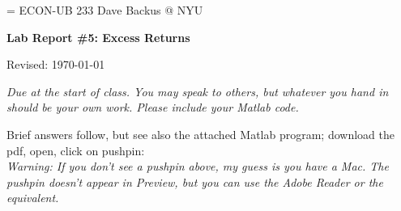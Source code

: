 \documentclass[11pt]{exam}
\begin{document}
\parskip=\bigskipamount
\parindent=0.0in
\thispagestyle{empty}
{\large ECON-UB 233 \hfill Dave Backus @ NYU}

\bigskip\bigskip
\centerline{\Large \bf Lab Report \#5: Excess Returns}
\centerline{Revised: \today}

\bigskip
{\it Due at the start of class.
You may speak to others, but whatever you hand in should be your own work.
Please include your Matlab code.}

\begin{solution}
Brief answers follow,
but see also the attached Matlab program;
download the pdf, open, click on pushpin:
 \\
{\it Warning:  If you don't see a pushpin above, my guess is you have a Mac.
The pushpin doesn't appear in Preview,
but you can use the Adobe Reader or the equivalent.}
\end{solution}
\end{document}
